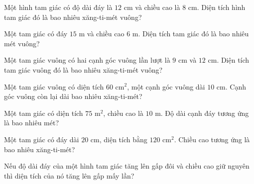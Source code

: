 
\begin{ex}
  Một hình tam giác có độ dài đáy là $12\text{ cm}$ và chiều cao là $8\text{ cm}$. Diện tích hình tam giác đó là bao nhiêu xăng-ti-mét vuông?
\end{ex}

\begin{ex}
  Một tam giác có đáy $15\text{ m}$ và chiều cao $6\text{ m}$. Diện tích tam giác đó là bao nhiêu mét vuông?
\end{ex}

\begin{ex}
  Một tam giác vuông có hai cạnh góc vuông lần lượt là $9\text{ cm}$ và $12\text{ cm}$. Diện tích tam giác vuông đó là bao nhiêu xăng-ti-mét vuông?
\end{ex}

\begin{ex}
  Một tam giác vuông có diện tích $60\text{ cm}^2$, một cạnh góc vuông dài $10\text{ cm}$. Cạnh góc vuông còn lại dài bao nhiêu xăng-ti-mét?
\end{ex}

\begin{ex}
  Một tam giác có diện tích $75\text{ m}^2$, chiều cao là $10\text{ m}$. Độ dài cạnh đáy tương ứng là bao nhiêu mét?
\end{ex}

\begin{ex}
  Một tam giác có đáy dài $20\text{ cm}$, diện tích bằng $120\text{ cm}^2$. Chiều cao tương ứng là bao nhiêu xăng-ti-mét?
\end{ex}

\begin{ex}
  Nếu độ dài đáy của một hình tam giác tăng lên gấp đôi và chiều cao giữ nguyên thì diện tích của nó tăng lên gấp mấy lần?
\end{ex}

